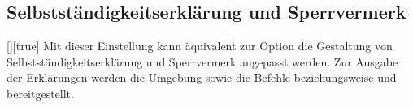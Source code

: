 \subsection{Selbstständigkeitserklärung und Sperrvermerk}
\begin{Declaration}{[\PSet]}[true]%
\printdeclarationlist%
%
%
Mit dieser Einstellung kann äquivalent zur Option  die 
Gestaltung von Selbstständigkeitserklärung und Sperrvermerk angepasst werden.
Zur Ausgabe der Erklärungen werden die Umgebung  
sowie die Befehle  beziehungsweise  und 
 bereitgestellt. 


\end{Declaration}
